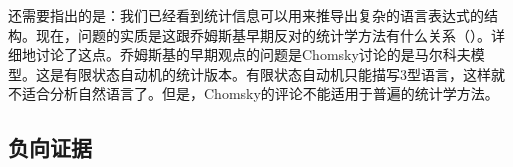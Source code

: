 还需要指出的是：我们已经看到统计信息可以用来推导出复杂的语言表达式的结构。现在，问题的实质是这跟乔姆斯基早期反对的统计学方法有什么关系（\citealp[]{Chomsky57a}）。\citet[Section~4.2]{Abney96a}详细地讨论了这点。乔姆斯基的早期观点的问题是Chomsky讨论的是马尔科夫模型。这是有限状态自动机的统计版本。有限状态自动机只能描写3型语言，这样就不适合分析自然语言了。但是，Chomsky的评论不能适用于普遍的统计学方法。

\subsection{负向证据}
\label{Abschnitt-negative-Evidenz}

